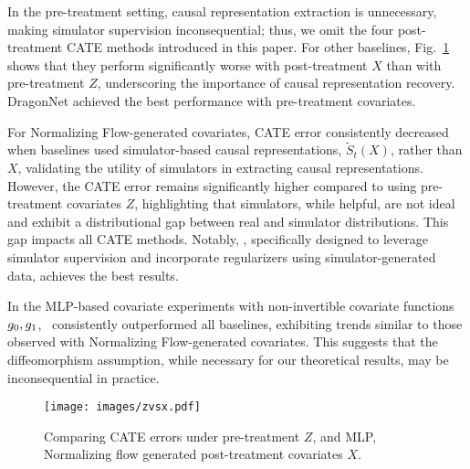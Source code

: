 In the pre-treatment setting, causal representation extraction is unnecessary, making simulator supervision inconsequential; thus, we omit the four post-treatment CATE methods introduced in this paper. For other baselines, Fig.~\ref{fig:mlp_expts} shows that they perform significantly worse with post-treatment $X$ than with pre-treatment $Z$, underscoring the importance of causal representation recovery. DragonNet achieved the best performance with pre-treatment covariates.

For Normalizing Flow-generated covariates, CATE error consistently decreased when baselines used simulator-based causal representations, $\tilde{S}_t(X)$, rather than $X$, validating the utility of simulators in extracting causal representations. However, the CATE error remains significantly higher compared to using pre-treatment covariates $Z$, highlighting that simulators, while helpful, are not ideal and exhibit a distributional gap between real and simulator distributions. This gap impacts all CATE methods. Notably, \our, specifically designed to leverage simulator supervision and incorporate regularizers using simulator-generated data, achieves the best results. 

In the MLP-based covariate experiments with non-invertible covariate functions $g_0, g_1$, \our\ consistently outperformed all baselines, exhibiting trends similar to those observed with Normalizing Flow-generated covariates. This suggests that the diffeomorphism assumption, while necessary for our theoretical results, may be inconsequential in practice.



\begin{figure}[!h]
    \centering
    \texttt{[image: images/zvsx.pdf]}
    \caption{Comparing CATE errors under pre-treatment $Z$, and MLP, Normalizing flow generated post-treatment covariates $X$.}
    \label{fig:mlp_expts}
\end{figure}


